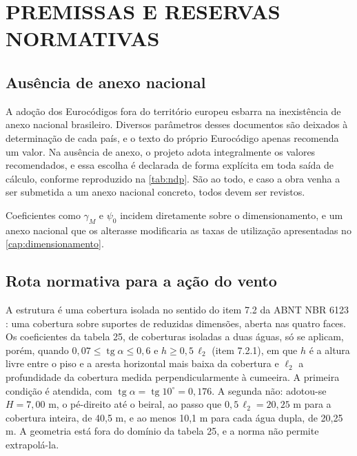 

\section{PREMISSAS E RESERVAS NORMATIVAS}\label{sec:premissas-reservas}

\subsection{Ausência de anexo nacional}\label{ssec:ndp}

A adoção dos Eurocódigos fora do território europeu esbarra na inexistência de
anexo nacional brasileiro. Diversos parâmetros desses documentos são deixados à
determinação de cada país, e o texto do próprio Eurocódigo apenas recomenda um
valor. Na ausência de anexo, o projeto adota integralmente os valores
recomendados, e essa escolha é declarada de forma explícita em toda saída de
cálculo, conforme reproduzido na \autoref{tab:ndp}. São \nNDPExt{} ao todo, e
caso a obra venha a ser submetida a um anexo nacional concreto, todos devem
ser revistos.



Coeficientes como $\gamma_M$ e $\psi_0$ incidem diretamente sobre o dimensionamento, e um anexo nacional que os
alterasse modificaria as taxas de utilização apresentadas no
\autoref{cap:dimensionamento}.

\subsection{Rota normativa para a ação do vento}\label{ssec:rota-vento}

A estrutura é uma cobertura isolada no sentido do item 7.2 da ABNT NBR 6123
\cite{NBR6123:2023}: uma cobertura sobre suportes de reduzidas dimensões, aberta
nas quatro faces. Os coeficientes da tabela 25, de coberturas isoladas a duas
águas, só se aplicam, porém, quando $0{,}07 \leq \operatorname{tg}\alpha \leq 0{,}6$
e $h \geq 0{,}5\,\ell_2$ (item 7.2.1), em que $h$ é a altura livre entre o piso e a
aresta horizontal mais baixa da cobertura e $\ell_2$ a profundidade da cobertura
medida perpendicularmente à cumeeira. A primeira condição é atendida, com
$\operatorname{tg}\alpha = \operatorname{tg} 10^{\circ} = 0{,}176$. A segunda não: adotou-se
$H = 7{,}00$ m, o pé-direito até o beiral, ao passo que $0{,}5\,\ell_2 = 20{,}25$ m
para a cobertura inteira, de 40,5 m, e ao menos 10,1 m para cada água dupla, de
20,25 m. A geometria está fora do domínio da tabela 25, e a norma não permite
extrapolá-la.

